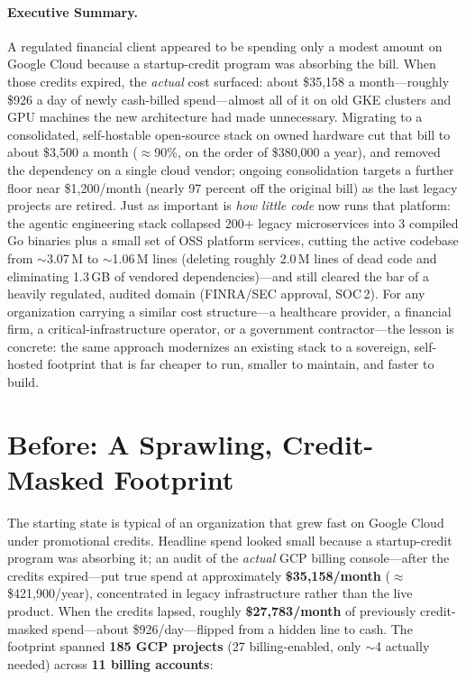 \documentclass[11pt,letterpaper]{article}
\begin{document}
\paragraph{Executive Summary.}
A regulated financial client appeared to be spending only a modest amount on Google
Cloud because a startup-credit program was absorbing the bill. When those credits
expired, the \emph{actual} cost surfaced: about \$35{,}158 a month---roughly \$926
a day of newly cash-billed spend---almost all of it on old GKE clusters and GPU
machines the new architecture had made unnecessary. Migrating to a consolidated,
self-hostable open-source stack on owned hardware cut that bill to about \$3{,}500 a
month ($\approx$90\%, on the order of \$380{,}000 a year), and removed the
dependency on a single cloud vendor; ongoing consolidation targets a further floor
near \$1{,}200/month (nearly 97 percent off the original bill) as the last legacy
projects are retired. Just as
important is \emph{how little code} now runs that platform: the agentic engineering
stack collapsed 200+ legacy microservices into 3 compiled Go binaries plus a small
set of OSS platform services, cutting the active codebase from $\sim$3.07\,M to
$\sim$1.06\,M lines (deleting roughly 2.0\,M lines of dead code and eliminating
1.3\,GB of vendored dependencies)---and still cleared the bar of a heavily
regulated, audited domain (FINRA/SEC approval, SOC\,2). For any organization
carrying a similar cost structure---a healthcare provider, a financial firm, a
critical-infrastructure operator, or a government contractor---the lesson is
concrete: the same approach modernizes an existing stack to a sovereign,
self-hosted footprint that is far cheaper
to run, smaller to maintain, and faster to build.

\tableofcontents
\newpage

\section{Before: A Sprawling, Credit-Masked Footprint}

The starting state is typical of an organization that grew fast on Google Cloud
under promotional credits. Headline spend looked small because a startup-credit
program was absorbing it; an audit of the \emph{actual} GCP billing console---after
the credits expired---put true spend at approximately \textbf{\$35{,}158/month}
($\approx$\$421{,}900/year), concentrated in legacy infrastructure rather than the
live product. When the credits lapsed, roughly \textbf{\$27{,}783/month} of
previously credit-masked spend---about \$926/day---flipped from a hidden line to
cash. The footprint spanned \textbf{185 GCP projects} (27 billing-enabled, only
$\sim$4 actually needed) across \textbf{11 billing accounts}:
\end{document}
